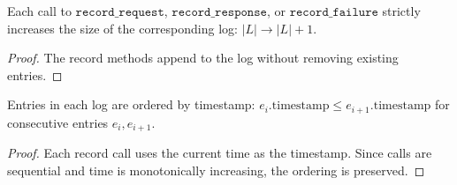 \documentclass[11pt]{article}
\begin{document}
\begin{lemma}
\label{lem:log-append}
Each call to $\texttt{record\_request}$, $\texttt{record\_response}$,
or $\texttt{record\_failure}$ strictly increases the size of the
corresponding log: $|L| \to |L| + 1$.
\end{lemma}

\begin{proof}
The record methods append to the log without removing existing
entries.
\end{proof}

\begin{lemma}
\label{lem:log-order}
Entries in each log are ordered by timestamp:
$e_i.\mathrm{timestamp} \leq e_{i+1}.\mathrm{timestamp}$
for consecutive entries $e_i, e_{i+1}$.
\end{lemma}

\begin{proof}
Each record call uses the current time as the timestamp.  Since
calls are sequential and time is monotonically increasing, the
ordering is preserved.
\end{proof}
\end{document}
